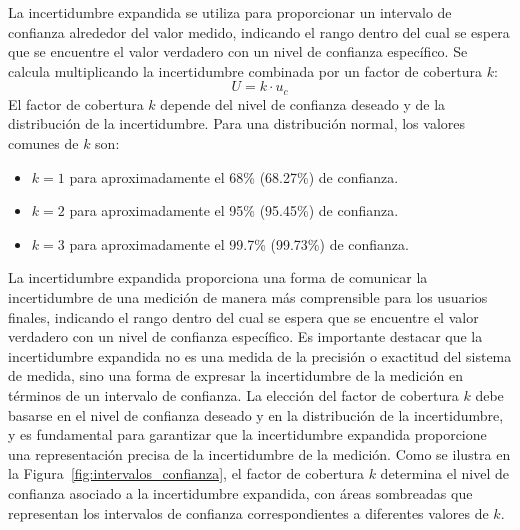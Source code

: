 La incertidumbre expandida se utiliza para proporcionar un intervalo de confianza alrededor del valor medido, indicando el rango dentro del cual se espera que se encuentre el valor verdadero con un nivel de confianza específico. Se calcula multiplicando la incertidumbre combinada por un factor de cobertura $k$:
\[U = k \cdot u_c
\]
El factor de cobertura $k$ depende del nivel de confianza deseado y de la distribución de la incertidumbre. Para una distribución normal, los valores comunes de $k$ son:
\begin{itemize}
    \item $k = 1$ para aproximadamente el 68\% (68.27\%) de confianza.
    \item $k = 2$ para aproximadamente el 95\% (95.45\%) de confianza.
    \item $k = 3$ para aproximadamente el 99.7\% (99.73\%) de confianza.
\end{itemize}
La incertidumbre expandida proporciona una forma de comunicar la incertidumbre de una medición de manera más comprensible para los usuarios finales, indicando el rango dentro del cual se espera que se encuentre el valor verdadero con un nivel de confianza específico. Es importante destacar que la incertidumbre expandida no es una medida de la precisión o exactitud del sistema de medida, sino una forma de expresar la incertidumbre de la medición en términos de un intervalo de confianza. La elección del factor de cobertura $k$ debe basarse en el nivel de confianza deseado y en la distribución de la incertidumbre, y es fundamental para garantizar que la incertidumbre expandida proporcione una representación precisa de la incertidumbre de la medición. Como se ilustra en la Figura~\ref{fig:intervalos_confianza}, el factor de cobertura $k$ determina el nivel de confianza asociado a la incertidumbre expandida, con áreas sombreadas que representan los intervalos de confianza correspondientes a diferentes valores de $k$.
